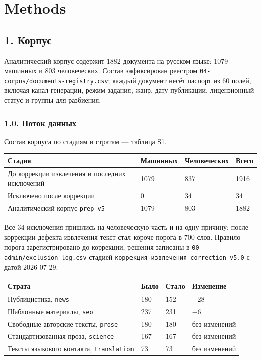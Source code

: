 \documentclass[11pt,a4paper]{article}
\renewcommand{\_}{\textunderscore\allowbreak}
\begin{document}
\section{Methods}

\subsection{1. Корпус}

Аналитический корпус содержит 1882 документа на русском языке: 1079 машинных и
803 человеческих. Состав зафиксирован реестром \texttt{04-\allowbreak{}corpus/documents-\allowbreak{}registry.csv};
каждый документ несёт паспорт из 60 полей, включая канал генерации, режим задания,
жанр, дату публикации, лицензионный статус и группы для разбиения.

\subsubsection{1.0. Поток данных}

Состав корпуса по стадиям и стратам — таблица S1.

\begin{center}
\small
\begin{tabularx}{\textwidth}{Xlll}
\toprule
Стадия & Машинных & Человеческих & Всего \\
\midrule
До коррекции извлечения и последних исключений & 1079 & 837 & 1916 \\
Исключено после коррекции & 0 & 34 & 34 \\
Аналитический корпус \texttt{prep-\allowbreak{}v5} & 1079 & 803 & 1882 \\
\bottomrule
\end{tabularx}
\end{center}

Все 34 исключения пришлись на человеческую часть и на одну причину: после
коррекции дефекта извлечения текст стал короче порога в 700 слов. Правило порога
зарегистрировано до коррекции, решения записаны в \texttt{00-\allowbreak{}admin/exclusion-\allowbreak{}log.csv}
стадией \texttt{коррекция извлечения correction-\allowbreak{}v5.0} с датой 2026-07-29.

\begin{center}
\small
\begin{tabular}{llll}
\toprule
Страта & Было & Стало & Изменение \\
\midrule
Публицистика, \texttt{news} & 180 & 152 & $-$28 \\
Шаблонные материалы, \texttt{seo} & 237 & 231 & $-$6 \\
Свободные авторские тексты, \texttt{prose} & 180 & 180 & без изменений \\
Стандартизованная проза, \texttt{science} & 167 & 167 & без изменений \\
Тексты языкового контакта, \texttt{translation} & 73 & 73 & без изменений \\
\bottomrule
\end{tabular}
\end{center}
\end{document}
